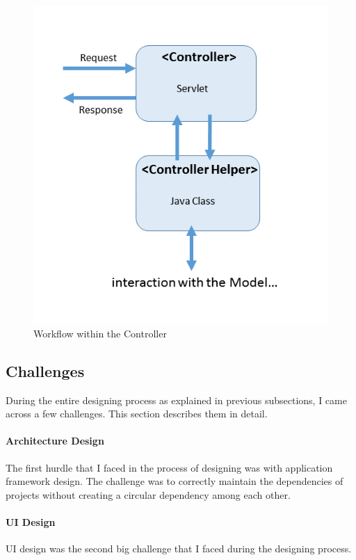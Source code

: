 \begin{figure}
	\includegraphics[width=1\textwidth]{figures/Controller_Workflow}
	\caption{Workflow within the Controller}
	\label{fig:Controller_Workflow}
\end{figure}

\subsection{Challenges}\label{subsec:designchallenges}
During the entire designing process as explained in previous subsections, I came across a few challenges. This section describes them in detail.

\paragraph{Architecture Design}
The first hurdle that I faced in the process of designing was with application framework design. The challenge was to correctly maintain the dependencies of projects without creating a circular dependency among each other.

\paragraph{UI Design}
UI design was the second big challenge that I faced during the designing process.

